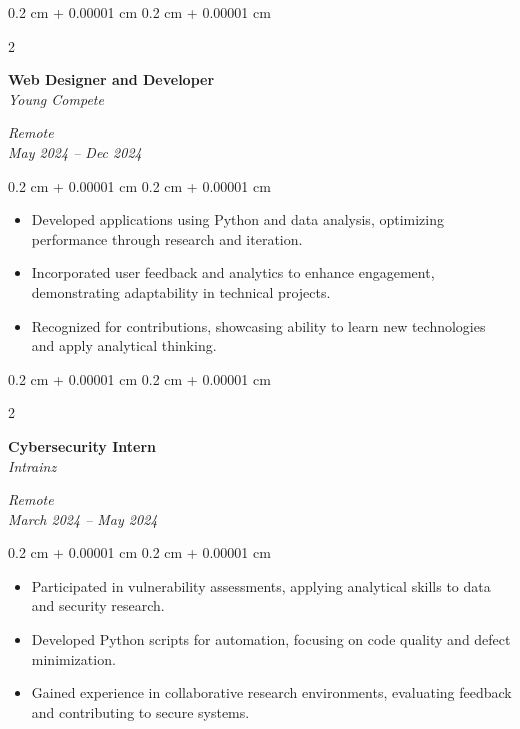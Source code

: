 \documentclass[10pt, letterpaper]{article}
\newenvironment{highlights}{
    \begin{itemize}[
        topsep=0.10 cm,
        parsep=0.10 cm,
        partopsep=0pt,
        itemsep=0pt,
        leftmargin=0.4 cm + 10pt
    ]
}{
    \end{itemize}
} %
\newenvironment{onecolentry}{
    \begin{adjustwidth}{
        0.2 cm + 0.00001 cm
    }{
        0.2 cm + 0.00001 cm
    }
}{
    \end{adjustwidth}
} %
\newenvironment{twocolentry}[2][]{
    \onecolentry
    \def\secondColumn{#2}
    \setcolumnwidth{\fill, 4.5 cm}
    \begin{paracol}{2}
}{
    \switchcolumn \raggedleft \secondColumn
    \end{paracol}
    \endonecolentry
} %
\begin{document}
    \begin{twocolentry}{
        \textit{Remote} \\
        \textit{May 2024 – Dec 2024}
    }
        \textbf{Web Designer and Developer} \\
        \textit{Young Compete}
    \end{twocolentry}
    \vspace{0.10 cm}
    \begin{onecolentry}
        \begin{highlights}
            \item Developed applications using Python and data analysis, optimizing performance through research and iteration.
            \item Incorporated user feedback and analytics to enhance engagement, demonstrating adaptability in technical projects.
            \item Recognized for contributions, showcasing ability to learn new technologies and apply analytical thinking.
        \end{highlights}
    \end{onecolentry}
    \vspace{0.2 cm}
    \begin{twocolentry}{
        \textit{Remote} \\
        \textit{March 2024 – May 2024}
    }
        \textbf{Cybersecurity Intern} \\
        \textit{Intrainz}
    \end{twocolentry}
    \vspace{0.10 cm}
    \begin{onecolentry}
        \begin{highlights}
            \item Participated in vulnerability assessments, applying analytical skills to data and security research.
            \item Developed Python scripts for automation, focusing on code quality and defect minimization.
            \item Gained experience in collaborative research environments, evaluating feedback and contributing to secure systems.
        \end{highlights}
    \end{onecolentry}
\end{document}
